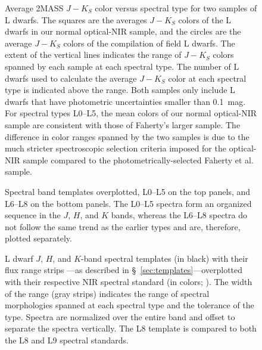 \documentclass[12pt,preprint]{aastex}
\begin{document}

\begin{figure}
		\caption{Average 2MASS $J-K_S$ color versus spectral type for two samples of L dwarfs. The squares are the averages $J-K_S$ colors of the L dwarfs in our normal optical-NIR sample, and the circles are the average $J-K_S$ colors of the \citet{Faherty13_0355} compilation of field L dwarfs. The extent of the vertical lines indicates the range of $J-K_S$ colors spanned by each sample at each spectral type. The number of L dwarfs used to calculate the average $J-K_S$ color at each spectral type is indicated above the range. Both samples only include L dwarfs that have photometric uncertainties smaller than 0.1~mag. For spectral types L0--L5, the mean colors of our normal optical-NIR sample are consistent with those of Faherty's larger sample. The difference in color ranges spanned by the two samples is due to the much stricter spectroscopic selection criteria imposed for the optical-NIR sample compared to the photometrically-selected Faherty et al. sample. 
}
	\label{fig:JK_colors_F13}
\end{figure}

\begin{figure}
	\caption{Spectral band templates overplotted, L0--L5 on the top panels, and L6--L8 on the bottom panels. %
	The L0--L5 spectra form an organized sequence in the $J$, $H$, and $K$ bands, whereas the L6--L8 spectra do not follow the same trend as the earlier types and are, therefore, plotted separately.}
	\label{fig:spec_sequence}
\end{figure}


\begin{figure}
		\caption{
	L dwarf $J$, $H$, and $K$-band spectral templates (in black) with their flux range strips ---as described in \S~\ref{sec:templates}---overplotted with their respective NIR spectral standard (in colors; \cite{Kirkpatrick10}). 
	The width of the range (gray strips) indicates the range of spectral morphologies spanned at each spectral type and the tolerance of the type.
	Spectra are normalized over the entire band and offset to separate the spectra vertically.
	The L8 template is compared to both the L8 and L9 spectral standards. }
	\label{fig:templates-stds}
\end{figure}
\end{document}
